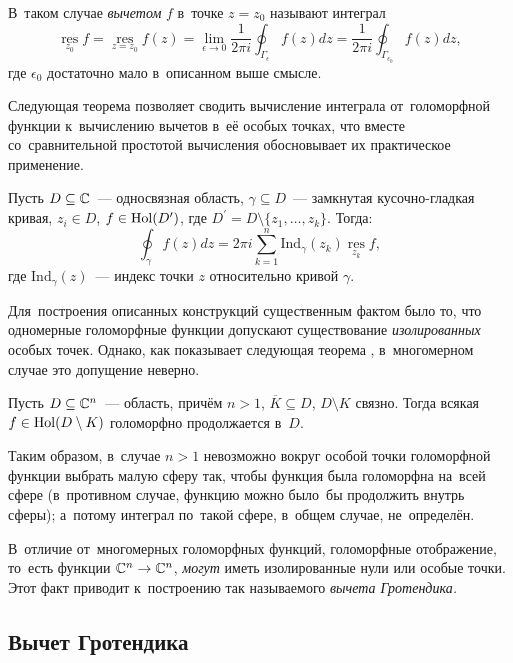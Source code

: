 \documentclass{article}
\begin{document}
В~таком случае \textit{вычетом} $f$ в~точке $z = z_0$ называют интеграл
$$
  \operatorname*{res}\limits_{z_0} f = \operatorname*{res}\limits_{z = z_0} f(z) = \lim\limits_{\epsilon \to 0} \frac{1}{2 \pi i} \oint_{\Gamma_\epsilon} f(z)dz = \frac{1}{2 \pi i} \oint_{\Gamma_{\epsilon_0}} f(z)dz,
$$
где $\epsilon_0$ достаточно мало в~описанном выше смысле.

Следующая теорема позволяет сводить вычисление интеграла от~голоморфной функции к~вычислению вычетов в~её особых точках,
что вместе со~сравнительной простотой вычисления обосновывает их практическое применение.
\begin{theorem*}
  Пусть $D \subseteq \mathbb{C}$~— односвязная область, $\gamma \subseteq D$~— замкнутая кусочно-гладкая кривая,
  $z_i \in D$, $f \in \mathrm{Hol}(D^\prime)$, где $D^\prime = D \setminus \{ z_1, \ldots, z_k \}$.
  Тогда:
  $$
    \oint_{\gamma} f(z)dz = 2 \pi i \sum_{k = 1}^{n} \mathrm{Ind}_{\gamma}(z_k) \operatorname*{res}\limits_{z_k} f,
  $$
  где $\mathrm{Ind}_{\gamma}(z)$~— индекс точки $z$ относительно кривой $\gamma$.
\end{theorem*}

Для~построения описанных конструкций существенным фактом было то, что одномерные голоморфные функции допускают
существование \textit{изолированных} особых точек. Однако, как показывает следующая теорема \cite{ShaII}, в~многомерном случае
это допущение неверно.

\begin{theorem*}
  Пусть $D \subseteq \mathbb{C}^n$~— область, причём $n > 1$, $\overline{K} \subseteq D$,
  $D \setminus K$ связно. Тогда всякая $f \in \mathrm{Hol}(D \setminus K)$
  голоморфно продолжается в~$D$.
\end{theorem*}

Таким образом, в~случае $n > 1$ невозможно вокруг особой точки голоморфной функции
выбрать малую сферу так, чтобы функция была голоморфна на~всей сфере (в~противном случае,
функцию можно было~бы продолжить внутрь сферы); а~потому интеграл по~такой сфере, в~общем случае, не~определён.

В~отличие от~многомерных голоморфных функций, голоморфные отображение, то~есть функции $\mathbb{C}^n \rightarrow \mathbb{C}^n$,
\textit{могут} иметь изолированные нули или особые точки. Этот факт приводит к~построению так называемого \textit{вычета Гротендика.}

\subsection{Вычет Гротендика}
\end{document}
